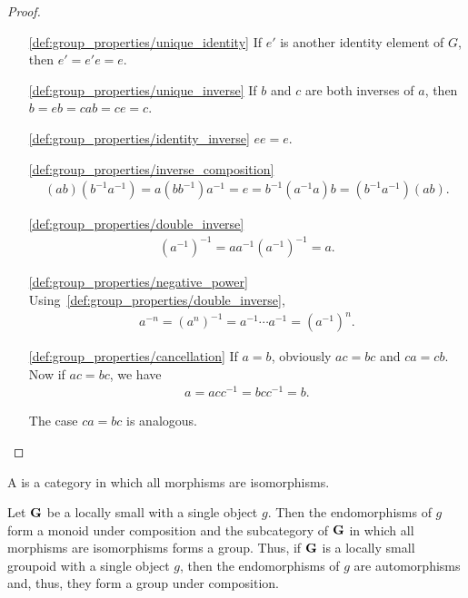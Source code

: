 \begin{proof}\mbox{}
  \begin{itemize}
    \item[\ref{def:group_properties/unique_identity}] If \( e' \) is another identity element of \( G \), then \( e' = e' e = e \).
    \item[\ref{def:group_properties/unique_inverse}] If \( b \) and \( c \) are both inverses of \( a \), then \( b = eb = cab = ce = c \).
    \item[\ref{def:group_properties/identity_inverse}] \( ee = e \).
    \item[\ref{def:group_properties/inverse_composition}]
    \begin{align*}
      (ab) (b^{-1} a^{-1})
      =
      a (b b^{-1}) a^{-1}
      =
      e
      =
      b^{-1} (a^{-1} a) b
      =
      (b^{-1} a^{-1}) (ab).
    \end{align*}

    \item[\ref{def:group_properties/double_inverse}]
    \begin{align*}
      (a^{-1})^{-1}
      =
      a a^{-1} (a^{-1})^{-1}
      =
      a.
    \end{align*}

    \item[\ref{def:group_properties/negative_power}] Using~\ref{def:group_properties/double_inverse},
    \begin{align*}
      a^{-n}
      =
      (a^n)^{-1}
      =
      a^{-1} \cdots a^{-1}
      =
      (a^{-1})^n.
    \end{align*}

    \item[\ref{def:group_properties/cancellation}] If \( a = b \), obviously \( ac = bc \) and \( ca = cb \). Now if \( ac = bc \), we have
    \begin{align*}
      a = acc^{-1} = bcc^{-1} = b.
    \end{align*}

    The case \( ca = bc \) is analogous.
  \end{itemize}
\end{proof}

\begin{definition}\label{def:groupoid}
  A  is a category in which all morphisms are isomorphisms.
\end{definition}

\begin{definition}\label{note:groupoids}
  Let \( \operatorname{\mathbf{G}} \) be a locally small with a single object \( g \). Then the endomorphisms of \( g \) form a monoid under composition and the subcategory of \( \operatorname{\mathbf{G}} \) in which all morphisms are isomorphisms forms a group. Thus, if \( \operatorname{\mathbf{G}} \) is a locally small groupoid with a single object \( g \), then the endomorphisms of \( g \) are automorphisms and, thus, they form a group under composition.
\end{definition}

